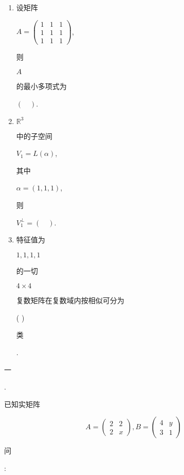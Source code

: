 \documentclass[10pt]{article}
\begin{document}
\begin{enumerate}
  \item \begin{CJK}{UTF8}{mj}设矩阵\end{CJK} $A=\left(\begin{array}{lll}1 & 1 & 1 \\ 1 & 1 & 1 \\ 1 & 1 & 1\end{array}\right)$, \begin{CJK}{UTF8}{mj}则\end{CJK} $A$ \begin{CJK}{UTF8}{mj}的最小多项式为\end{CJK} $(\quad)$.

  \item $\mathbb{R}^{3}$ \begin{CJK}{UTF8}{mj}中的子空间\end{CJK} $V_{1}=L(\alpha)$, \begin{CJK}{UTF8}{mj}其中\end{CJK} $\alpha=(1,1,1)$, \begin{CJK}{UTF8}{mj}则\end{CJK} $V_{1}^{\perp}=(\quad)$.

  \item \begin{CJK}{UTF8}{mj}特征值为\end{CJK} $1,1,1,1$ \begin{CJK}{UTF8}{mj}的一切\end{CJK} $4 \times 4$ \begin{CJK}{UTF8}{mj}复数矩阵在复数域内按相似可分为\end{CJK} ( ) \begin{CJK}{UTF8}{mj}类\end{CJK}.

\end{enumerate}
\begin{CJK}{UTF8}{mj}一\end{CJK}. \begin{CJK}{UTF8}{mj}已知实矩阵\end{CJK}
$$
A=\left(\begin{array}{ll}
2 & 2 \\
2 & x
\end{array}\right), B=\left(\begin{array}{ll}
4 & y \\
3 & 1
\end{array}\right)
$$
\begin{CJK}{UTF8}{mj}问\end{CJK}:
\end{document}
